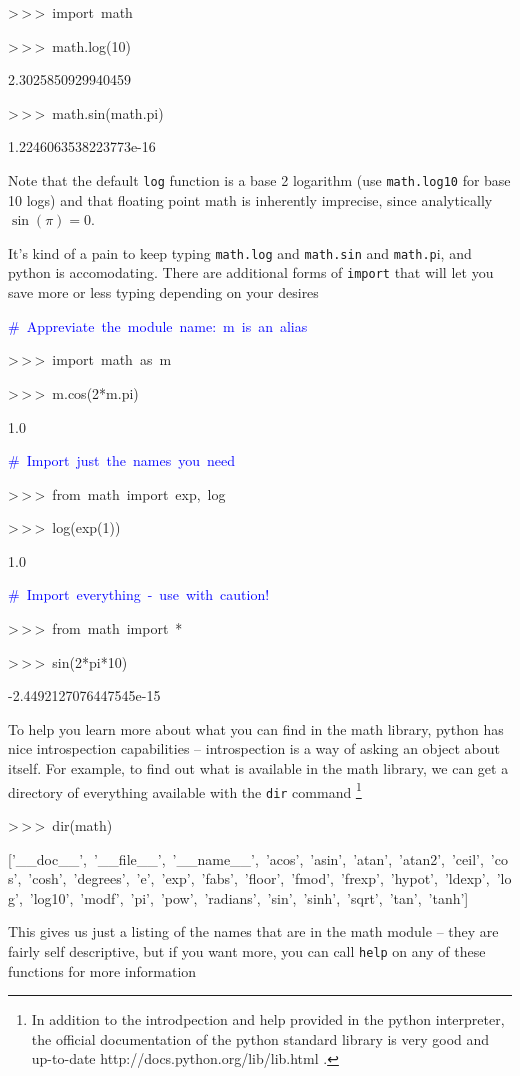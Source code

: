 \begin{lyxcode}
>\,{}>\,{}>~import~math

>\,{}>\,{}>~math.log(10)

2.3025850929940459

>\,{}>\,{}>~math.sin(math.pi)

1.2246063538223773e-16
\end{lyxcode}
Note that the default \texttt{log} function is a base 2 logarithm
(use \texttt{math.log10} for base 10 logs) and that floating point
math is inherently imprecise, since analytically$\sin(\pi)=0$.

It's kind of a pain to keep typing \texttt{math.log} and \texttt{math.sin}
and \texttt{math.p}i, and python is accomodating. There are additional
forms of \texttt{import} that will let you save more or less typing
depending on your desires

\begin{lyxcode}
\textcolor{blue}{\#~Appreviate~the~module~name:~m~is~an~alias}

>\,{}>\,{}>~import~math~as~m

>\,{}>\,{}>~m.cos(2{*}m.pi)

1.0



\textcolor{blue}{\#~Import~just~the~names~you~need}

>\,{}>\,{}>~from~math~import~exp,~log

>\,{}>\,{}>~log(exp(1))

1.0



\textcolor{blue}{\#~Import~everything~-~use~with~caution!}

>\,{}>\,{}>~from~math~import~{*}

>\,{}>\,{}>~sin(2{*}pi{*}10)

-2.4492127076447545e-15
\end{lyxcode}
To help you learn more about what you can find in the math library,
python has nice introspection capabilities -- introspection is a way
of asking an object about itself. For example, to find out what is
available in the math library, we can get a directory of everything
available with the \texttt{dir} command%
\footnote{In addition to the introdpection and help provided in the python interpreter,
the official documentation of the python standard library is very
good and up-to-date http://docs.python.org/lib/lib.html .%
}

\begin{lyxcode}
>\,{}>\,{}>~dir(math)

{[}'\_\_doc\_\_',~'\_\_file\_\_',~'\_\_name\_\_',~'acos',~'asin',~'atan',~'atan2',~'ceil',~'cos',~'cosh',~'degrees',~'e',~'exp',~'fabs',~'floor',~'fmod',~'frexp',~'hypot',~'ldexp',~'log',~'log10',~'modf',~'pi',~'pow',~'radians',~'sin',~'sinh',~'sqrt',~'tan',~'tanh']
\end{lyxcode}
This gives us just a listing of the names that are in the math module
-- they are fairly self descriptive, but if you want more, you can
call \texttt{help} on any of these functions for more information

